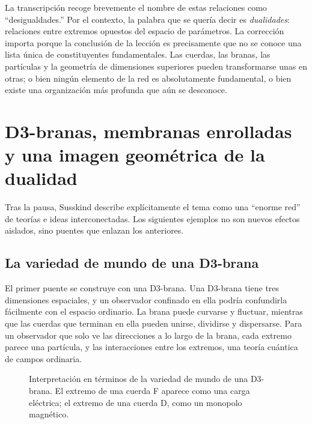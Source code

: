 La transcripción recoge brevemente el nombre de estas relaciones como ``desigualdades.'' Por el contexto, la palabra que se quería decir es \emph{dualidades}: relaciones entre extremos opuestos del espacio de parámetros. La corrección importa porque la conclusión de la lección es precisamente que no se conoce una lista única de constituyentes fundamentales. Las cuerdas, las branas, las partículas y la geometría de dimensiones superiores pueden transformarse unas en otras; o bien ningún elemento de la red es absolutamente fundamental, o bien existe una organización más profunda que aún se desconoce.

\section{D3-branas, membranas enrolladas y una imagen geométrica de la dualidad}

Tras la pausa, Susskind describe explícitamente el tema como una ``enorme red'' de teorías e ideas interconectadas. Los siguientes ejemplos no son nuevos efectos aislados, sino puentes que enlazan los anteriores.

\subsection{La variedad de mundo de una D3-brana}

El primer puente se construye con una D3-brana. Una D3-brana tiene tres dimensiones espaciales, y un observador confinado en ella podría confundirla fácilmente con el espacio ordinario. La brana puede curvarse y fluctuar, mientras que las cuerdas que terminan en ella pueden unirse, dividirse y dispersarse. Para un observador que solo ve las direcciones a lo largo de la brana, cada extremo parece una partícula, y las interacciones entre los extremos, una teoría cuántica de campos ordinaria.

\begin{figure}[htbp]
\centering
{}%
\caption{Interpretación en términos de la variedad de mundo de una D3-brana. El extremo de una cuerda F aparece como una carga eléctrica; el extremo de una cuerda D, como un monopolo magnético.}
\end{figure}


